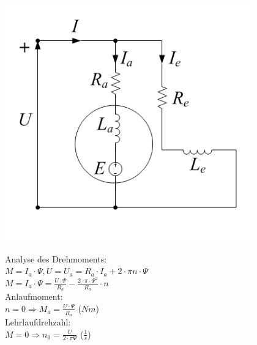 \begin{minipage}{0.4 \linewidth}
\includegraphics[width = \linewidth]{./Pics/VL45/Nebenschluss}
\end{minipage}
\begin{minipage}{0.6 \linewidth}
Analyse des Drehmoments: \\ 

$M = I_a \cdot \Psi, U = U_a = R_a \cdot I_a + 2 \cdot \pi n \cdot \Psi$ \\

$M = I_a \cdot \Psi = \frac{U \cdot \Psi}{R_a} - \frac{2 \cdot \pi \cdot \Psi^2}{R_a} \cdot n$ \\

Anlaufmoment: \\

$n = 0 \Rightarrow M_a = \frac{U \cdot \Psi}{R_a}$ ($Nm$) \\

Lehrlaufdrehzahl: \\

$M = 0 \Rightarrow n_0 = \frac{U}{2 \cdot \pi \Psi} $ ($\frac{{1}}{s}$)
\end{minipage}

